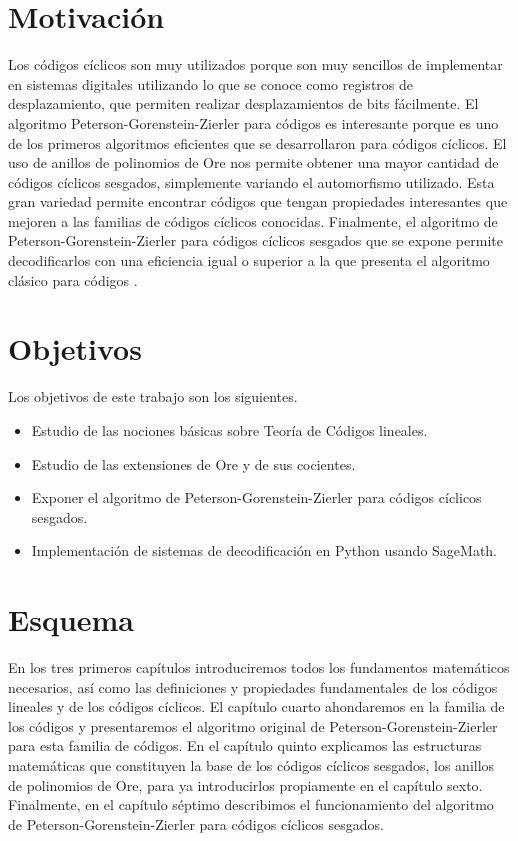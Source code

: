 \section*{Motivación}

Los códigos cíclicos son muy utilizados porque son muy sencillos de implementar en sistemas digitales utilizando lo que se conoce como registros de desplazamiento, que permiten realizar desplazamientos de bits fácilmente.
El algoritmo Peterson-Gorenstein-Zierler para códigos  es interesante porque es uno de los primeros algoritmos eficientes que se desarrollaron para códigos cíclicos.
El uso de anillos de polinomios de Ore nos permite obtener una mayor cantidad de códigos cíclicos sesgados, simplemente variando el automorfismo utilizado.
Esta gran variedad permite encontrar códigos que tengan propiedades interesantes que mejoren a las familias de códigos cíclicos conocidas.
Finalmente, el algoritmo de Peterson-Gorenstein-Zierler para códigos cíclicos sesgados que se expone permite decodificarlos con una eficiencia igual o superior a la que presenta el algoritmo clásico para códigos .

\section*{Objetivos}

Los objetivos de este trabajo son los siguientes. \begin{itemize}
  \item Estudio de las nociones básicas sobre Teoría de Códigos lineales.
  \item Estudio de las extensiones de Ore y de sus cocientes.
  \item Exponer el algoritmo de Peterson-Gorenstein-Zierler para códigos cíclicos sesgados.
  \item Implementación de sistemas de decodificación en Python usando SageMath.
\end{itemize}

\section*{Esquema}

En los tres primeros capítulos introduciremos todos los fundamentos matemáticos necesarios, así como las definiciones y propiedades fundamentales de los códigos lineales y de los códigos cíclicos.
El capítulo cuarto ahondaremos en la familia de los códigos  y presentaremos el algoritmo original de Peterson-Gorenstein-Zierler para esta familia de códigos.
En el capítulo quinto explicamos las estructuras matemáticas que constituyen la base de los códigos cíclicos sesgados, los anillos de polinomios de Ore, para ya introducirlos propiamente en el capítulo sexto.
Finalmente, en el capítulo séptimo describimos el funcionamiento del algoritmo de Peterson-Gorenstein-Zierler para códigos cíclicos sesgados.




